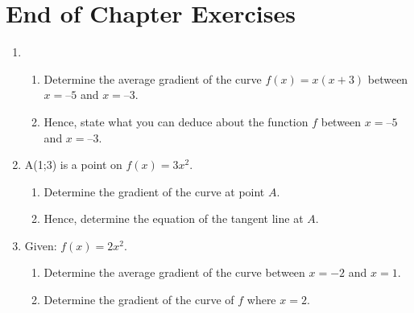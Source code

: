 \section{End of Chapter Exercises}
\begin{enumerate}
\item{}
\begin{enumerate}
\item{Determine the average gradient of the curve $f(x) = x(x+3)$ between $x = 5$ and $x = 3$.}
\item{Hence, state what you can deduce about the function $f$ between $x = 5$ and $x = 3$.}
\end{enumerate}
\item{A(1;3) is a point on $f(x)=3x^2$.}{
\begin{enumerate}
\item{Determine the gradient of the curve at point $A$.}
\item{Hence, determine the equation of the tangent line at $A$.}
\end{enumerate}
}
\item{Given: $f(x)=2x^2$.}{
\begin{enumerate}
\item{Determine the average gradient of the curve between $x=-2$ and $x=1$.}
\item{Determine the gradient of the curve of $f$ where $x=2$.}
\end{enumerate}}
\end{enumerate}







